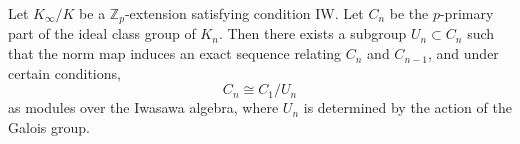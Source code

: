 Let $K_{\infty}/K$ be a $\mathbb{Z}_p$-extension satisfying condition IW. Let $C_n$ be the $p$-primary part of the ideal class group of $K_n$. Then there exists a subgroup $U_n \subset C_n$ such that the norm map induces an exact sequence relating $C_n$ and $C_{n-1}$, and under certain conditions,
$$C_n \cong C_1 / U_n$$
as modules over the Iwasawa algebra, where $U_n$ is determined by the action of the Galois group.
